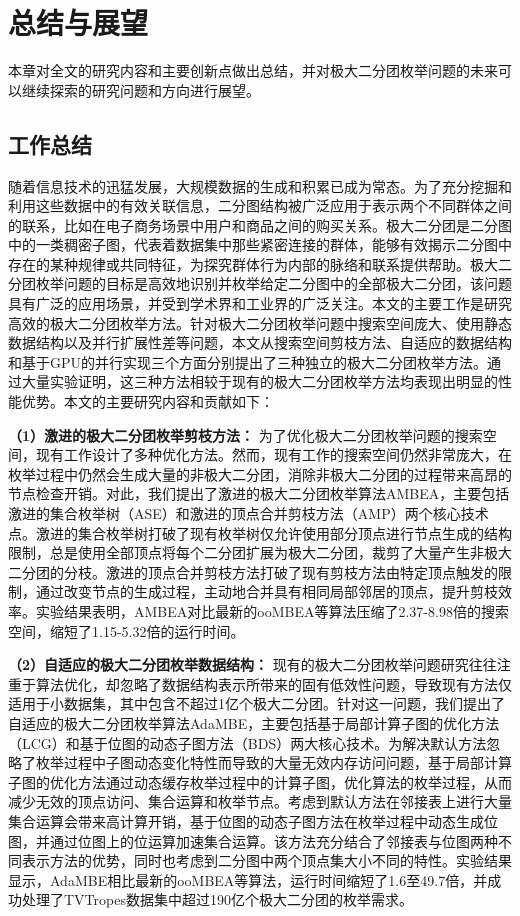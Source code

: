 \chapter{总结与展望}

本章对全文的研究内容和主要创新点做出总结，并对极大二分团枚举问题的未来可以继续探索的研究问题和方向进行展望。

\section{工作总结}

随着信息技术的迅猛发展，大规模数据的生成和积累已成为常态。为了充分挖掘和利用这些数据中的有效关联信息，二分图结构被广泛应用于表示两个不同群体之间的联系，比如在电子商务场景中用户和商品之间的购买关系。极大二分团是二分图中的一类稠密子图，代表着数据集中那些紧密连接的群体，能够有效揭示二分图中存在的某种规律或共同特征，为探究群体行为内部的脉络和联系提供帮助。极大二分团枚举问题的目标是高效地识别并枚举给定二分图中的全部极大二分团，该问题具有广泛的应用场景，并受到学术界和工业界的广泛关注。本文的主要工作是研究高效的极大二分团枚举方法。针对极大二分团枚举问题中搜索空间庞大、使用静态数据结构以及并行扩展性差等问题，本文从搜索空间剪枝方法、自适应的数据结构和基于GPU的并行实现三个方面分别提出了三种独立的极大二分团枚举方法。通过大量实验证明，这三种方法相较于现有的极大二分团枚举方法均表现出明显的性能优势。本文的主要研究内容和贡献如下：

\textbf{（1）激进的极大二分团枚举剪枝方法：} 为了优化极大二分团枚举问题的搜索空间，现有工作设计了多种优化方法。然而，现有工作的搜索空间仍然非常庞大，在枚举过程中仍然会生成大量的非极大二分团，消除非极大二分团的过程带来高昂的节点检查开销。对此，我们提出了激进的极大二分团枚举算法AMBEA，主要包括激进的集合枚举树（ASE）和激进的顶点合并剪枝方法（AMP）两个核心技术点。激进的集合枚举树打破了现有枚举树仅允许使用部分顶点进行节点生成的结构限制，总是使用全部顶点将每个二分团扩展为极大二分团，裁剪了大量产生非极大二分团的分枝。激进的顶点合并剪枝方法打破了现有剪枝方法由特定顶点触发的限制，通过改变节点的生成过程，主动地合并具有相同局部邻居的顶点，提升剪枝效率。实验结果表明，AMBEA对比最新的ooMBEA等算法压缩了2.37-8.98倍的搜索空间，缩短了1.15-5.32倍的运行时间。

\textbf{（2）自适应的极大二分团枚举数据结构：} 现有的极大二分团枚举问题研究往往注重于算法优化，却忽略了数据结构表示所带来的固有低效性问题，导致现有方法仅适用于小数据集，其中包含不超过1亿个极大二分团。针对这一问题，我们提出了自适应的极大二分团枚举算法AdaMBE，主要包括基于局部计算子图的优化方法（LCG）和基于位图的动态子图方法（BDS）两大核心技术。为解决默认方法忽略了枚举过程中子图动态变化特性而导致的大量无效内存访问问题，基于局部计算子图的优化方法通过动态缓存枚举过程中的计算子图，优化算法的枚举过程，从而减少无效的顶点访问、集合运算和枚举节点。考虑到默认方法在邻接表上进行大量集合运算会带来高计算开销，基于位图的动态子图方法在枚举过程中动态生成位图，并通过位图上的位运算加速集合运算。该方法充分结合了邻接表与位图两种不同表示方法的优势，同时也考虑到二分图中两个顶点集大小不同的特性。实验结果显示，AdaMBE相比最新的ooMBEA等算法，运行时间缩短了1.6至49.7倍，并成功处理了TVTropes数据集中超过190亿个极大二分团的枚举需求。

